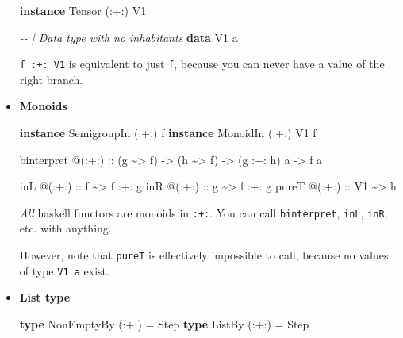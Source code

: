 \documentclass[]{article}
\newenvironment{Shaded}{}{}
\newcommand{\CommentTok}[1]{\textcolor[rgb]{0.38,0.63,0.69}{\textit{#1}}}
\newcommand{\DataTypeTok}[1]{\textcolor[rgb]{0.56,0.13,0.00}{#1}}
\newcommand{\KeywordTok}[1]{\textcolor[rgb]{0.00,0.44,0.13}{\textbf{#1}}}
\newcommand{\NormalTok}[1]{#1}
\newcommand{\OperatorTok}[1]{\textcolor[rgb]{0.40,0.40,0.40}{#1}}
\newcommand{\OtherTok}[1]{\textcolor[rgb]{0.00,0.44,0.13}{#1}}
\begin{document}
\begin{itemize}
\begin{Shaded}
\begin{Highlighting}[]
\KeywordTok{instance} \DataTypeTok{Tensor}\NormalTok{ (}\OperatorTok{:+:}\NormalTok{) }\DataTypeTok{V1}

\CommentTok{{-}{-} | Data type with no inhabitants}
\KeywordTok{data} \DataTypeTok{V1}\NormalTok{ a}
\end{Highlighting}
\end{Shaded}

  \texttt{f\ :+:\ V1} is equivalent to just \texttt{f}, because you can never
  have a value of the right branch.
\item
  \textbf{Monoids}

\begin{Shaded}
\begin{Highlighting}[]
\KeywordTok{instance} \DataTypeTok{SemigroupIn}\NormalTok{ (}\OperatorTok{:+:}\NormalTok{) f}
\KeywordTok{instance} \DataTypeTok{MonoidIn}\NormalTok{    (}\OperatorTok{:+:}\NormalTok{) }\DataTypeTok{V1}\NormalTok{ f}

\NormalTok{binterpret }\OperatorTok{@}\NormalTok{(}\OperatorTok{:+:}\NormalTok{)}
\OtherTok{    ::}\NormalTok{ (g }\OperatorTok{\textasciitilde{}\textgreater{}}\NormalTok{ f)}
    \OtherTok{{-}\textgreater{}}\NormalTok{ (h }\OperatorTok{\textasciitilde{}\textgreater{}}\NormalTok{ f)}
    \OtherTok{{-}\textgreater{}}\NormalTok{ (g }\OperatorTok{:+:}\NormalTok{ h) a}
    \OtherTok{{-}\textgreater{}}\NormalTok{ f a}

\NormalTok{inL   }\OperatorTok{@}\OtherTok{(:+:) ::}\NormalTok{ f     }\OperatorTok{\textasciitilde{}\textgreater{}}\NormalTok{ f }\OperatorTok{:+:}\NormalTok{ g}
\NormalTok{inR   }\OperatorTok{@}\OtherTok{(:+:) ::}\NormalTok{ g     }\OperatorTok{\textasciitilde{}\textgreater{}}\NormalTok{ f }\OperatorTok{:+:}\NormalTok{ g}
\NormalTok{pureT }\OperatorTok{@}\OtherTok{(:+:) ::} \DataTypeTok{V1} \OperatorTok{\textasciitilde{}\textgreater{}}\NormalTok{ h}
\end{Highlighting}
\end{Shaded}

  \emph{All} haskell functors are monoids in \texttt{:+:}. You can call
  \texttt{binterpret}, \texttt{inL}, \texttt{inR}, etc. with anything.

  However, note that \texttt{pureT} is effectively impossible to call, because
  no values of type \texttt{V1\ a} exist.
\item
  \textbf{List type}

\begin{Shaded}
\begin{Highlighting}[]
\KeywordTok{type} \DataTypeTok{NonEmptyBy}\NormalTok{ (}\OperatorTok{:+:}\NormalTok{) }\OtherTok{=} \DataTypeTok{Step}
\KeywordTok{type} \DataTypeTok{ListBy}\NormalTok{     (}\OperatorTok{:+:}\NormalTok{) }\OtherTok{=} \DataTypeTok{Step}
\end{Highlighting}
\end{Shaded}


\end{itemize}
\end{document}
